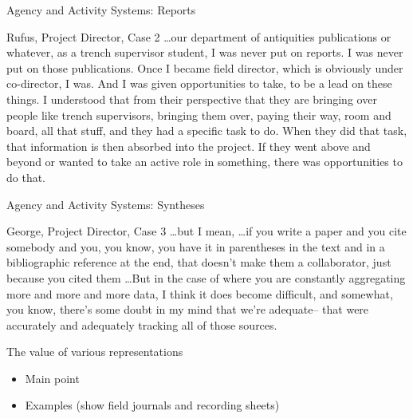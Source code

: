 \documentclass{beamer}
\begin{document}
\begin{frame}{Agency and Activity Systems: Reports}

  \begin{block}{Rufus, Project Director, Case 2}
    \dots our department of antiquities publications or whatever, as a trench supervisor student, I was never put on reports. I was never put on those publications. Once I became field director, which is obviously under co-director, I was. And I was given opportunities to take, to be a lead on these things. I understood that from their perspective that they are bringing over people like trench supervisors, bringing them over, paying their way, room and board, all that stuff, and they had a specific task to do. When they did that task, that information is then absorbed into the project. If they went above and beyond or wanted to take an active role in something, there was opportunities to do that.
  \end{block}

\end{frame}

\begin{frame}{Agency and Activity Systems: Syntheses}

  \begin{block}{George, Project Director, Case 3}
    \dots but I mean, \dots if you write a paper and you cite somebody and you, you know, you have it in parentheses in the text and in a bibliographic reference at the end, that doesn’t make them a collaborator, just because you cited them \dots But in the case of where you are constantly aggregating more and more and more data, I think it does become difficult, and somewhat, you know, there’s some doubt in my mind that we’re adequate– that were accurately and adequately tracking all of those sources.
  \end{block}

\end{frame}

\begin{frame}{The value of various representations}
  \begin{itemize}
    \item Main point
    \item Examples (show field journals and recording sheets)
  \end{itemize}
\end{frame}
\end{document}
